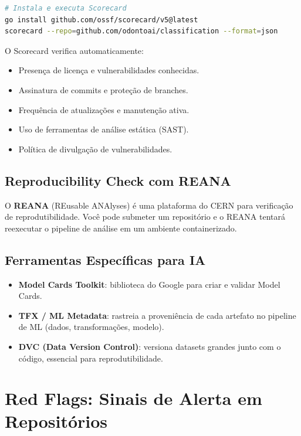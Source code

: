 \begin{lstlisting}[language=bash]
# Instala e executa Scorecard
go install github.com/ossf/scorecard/v5@latest
scorecard --repo=github.com/odontoai/classification --format=json
\end{lstlisting}

O Scorecard verifica automaticamente:
\begin{itemize}
  \item Presença de licença e vulnerabilidades conhecidas.
  \item Assinatura de commits e proteção de branches.
  \item Frequência de atualizações e manutenção ativa.
  \item Uso de ferramentas de análise estática (SAST).
  \item Política de divulgação de vulnerabilidades.
\end{itemize}

\subsection{Reproducibility Check com REANA}

O \textbf{REANA} (REusable ANAlyses) é uma plataforma do CERN para
verificação de reprodutibilidade. Você pode submeter um repositório
e o REANA tentará reexecutar o pipeline de análise em um ambiente
containerizado.

\subsection{Ferramentas Específicas para IA}

\begin{itemize}
  \item \textbf{Model Cards Toolkit}: biblioteca do Google para criar e
    validar Model Cards.
  \item \textbf{TFX / ML Metadata}: rastreia a proveniência de cada
    artefato no pipeline de ML (dados, transformações, modelo).
  \item \textbf{DVC (Data Version Control)}: versiona datasets grandes
    junto com o código, essencial para reprodutibilidade.
\end{itemize}

\section{Red Flags: Sinais de Alerta em Repositórios}

